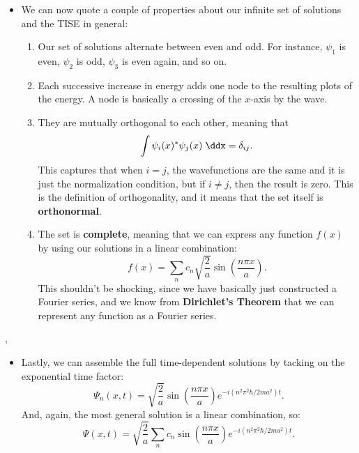 \begin{itemize}
    \item We can now quote a couple of properties about our infinite set of solutions and the TISE in general:
    \begin{enumerate}
        \item Our set of solutions alternate between even and odd. For instance, $\psi_1$ is even, $\psi_2$ is odd, $\psi_3$ is even again, and so on.
        \item Each successive increase in energy adds one node to the resulting plots of the energy. A node is basically a crossing of the $x$-axis by the wave.
        \item They are mutually orthogonal to each other, meaning that
            \begin{equation}
                \int \psi_i(x)^* \psi_j(x) \;\ddx = \delta_{ij}.\label{WavefunctionOrthogonality}
            \end{equation}
            This captures that when $i=j$, the wavefunctions are the same and it is just the normalization condition, but if $i\neq j$, then the result is zero. This is the definition of orthogonality, and it means that the set itself is \textbf{orthonormal}.
        \item The set is \textbf{complete}, meaning that we can express any function $f(x)$ by using our solutions in a linear combination:
            \begin{equation*}
                f(x) = \sum_n c_n \sqrt{\frac{2}{a}}\sin\left(\frac{n\pi x}{a}\right).
            \end{equation*}
            This shouldn't be shocking, since we have basically just constructed a Fourier series, and we know from \textbf{Dirichlet's Theorem} that we can represent any function as a Fourier series.
    \end{enumerate}
\end{itemize}

\sep

\begin{itemize}
    \item Lastly, we can assemble the full time-dependent solutions by tacking on the exponential time factor:
        \begin{equation*}
            \Psi_n(x,t) = \sqrt{\frac{2}{a}} \sin\left(\frac{n\pi x}{a}\right) e^{-i(n^2\pi^2\hbar/2ma^2)t}.
        \end{equation*}
        And, again, the most general solution is a linear combination, so:
        \begin{equation}
            \boxed{\Psi(x,t) = \sqrt{\frac{2}{a}} \sum_n c_n \sin\left(\frac{n\pi x}{a}\right)e^{-i(n^2\pi^2\hbar/2ma^2)t}.}\label{InfSquareWellFullSolution}
        \end{equation}
\end{itemize}


